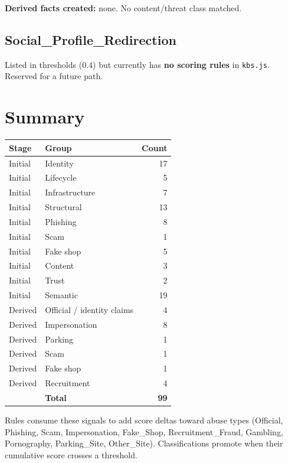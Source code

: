 \documentclass[11pt,a4paper]{article}
\begin{document}
\textbf{Derived facts created:} none.
No content/threat class matched.

\subsection{Social\_Profile\_Redirection}

Listed in thresholds ($0.4$) but currently has \textbf{no scoring rules}
in \texttt{kbs.js}. Reserved for a future path.

\section*{Summary}

\begin{center}
\begin{tabular}{@{}llr@{}}
  \toprule
  \textbf{Stage} & \textbf{Group} & \textbf{Count} \\
  \midrule
  Initial & Identity & 17 \\
  Initial & Lifecycle & 5 \\
  Initial & Infrastructure & 7 \\
  Initial & Structural & 13 \\
  Initial & Phishing & 8 \\
  Initial & Scam & 1 \\
  Initial & Fake shop & 5 \\
  Initial & Content & 3 \\
  Initial & Trust & 2 \\
  Initial & Semantic & 19 \\
  \midrule
  Derived & Official / identity claims & 4 \\
  Derived & Impersonation & 8 \\
  Derived & Parking & 1 \\
  Derived & Scam & 1 \\
  Derived & Fake shop & 1 \\
  Derived & Recruitment & 4 \\
  \midrule
  & \textbf{Total} & \textbf{99} \\
  \bottomrule
\end{tabular}
\end{center}

\medskip
\noindent
Rules consume these signals to add score deltas toward abuse types (Official, Phishing, Scam, Impersonation, Fake\_Shop, Recruitment\_Fraud, Gambling, Pornography, Parking\_Site, Other\_Site). Classifications promote when their cumulative score crosses a threshold.
\end{document}
